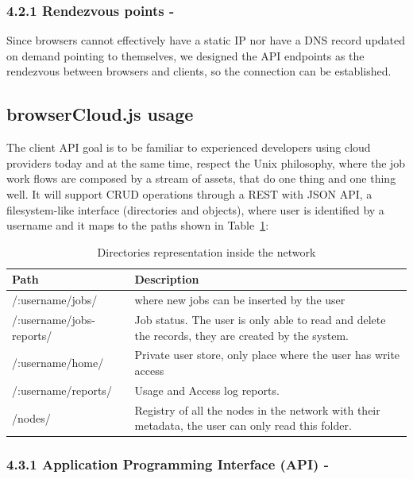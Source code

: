 \subsubsection{4.2.1 Rendezvous points -}

Since browsers cannot effectively have a static IP nor have a DNS record updated on demand pointing to themselves, we designed the API endpoints as the rendezvous between browsers and clients, so the connection can be established.

\subsection{browserCloud.js usage}

The client API goal is to be familiar to experienced developers using cloud providers today and at the same time, respect the Unix philosophy, where the job work flows are composed by a stream of assets, that do one thing and one thing well. It will support CRUD operations through a REST with JSON API, a filesystem-like interface (directories and objects), where user is identified by a username and it maps to the paths shown in Table~\ref{tbl:dirrepnet}: 

\begin{table}
  \begin{tabular}{ p{3cm} | p{9cm} }
  Path & Description \\
  \hline 
  /:username/jobs/ & where new jobs can be inserted by the user \\
  \hline
  /:username/jobs-reports/ & Job status. The user is only able to read and delete the records, they are created by the system. \\
  \hline 
  /:username/home/ &  Private user store, only place where the user has write access \\
  \hline   
  /:username/reports/ & Usage and Access log reports. \\ 
  \hline   
  /nodes/ & Registry of all the nodes in the network with their metadata, the user can only read this folder. \\
  \end{tabular}
  \caption{Directories representation inside the network}
  \label{tbl:dirrepnet}
\end{table}

\subsubsection{4.3.1 Application Programming Interface (API) -}

